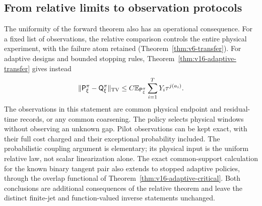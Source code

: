 \subsection{From relative limits to observation protocols}
The uniformity of the forward theorem also has an operational consequence.
For a fixed list of observations, the relative comparison controls the
entire physical experiment, with the failure atom retained
(Theorem~\ref{thm:v6-transfer}). For adaptive designs and bounded
stopping rules, Theorem~\ref{thm:v16-adaptive-transfer} gives instead
\[
 \|\mathsf P_\xi^\pi-\mathsf Q_\xi^\pi\|_{\rm TV}
 \le C\mathbb E_{\mathsf P_\xi^\pi}
                 \sum_{i=1}^{T}Y_i\tau^{j(a_i)}.
\]
The observations in this statement are common physical endpoint and
residual-time records, or any common coarsening. The policy selects physical
windows without observing an unknown gap. Pilot observations can be kept
exact, with their full cost charged and their exceptional probability
included. The probabilistic coupling argument is elementary; its physical
input is the uniform relative law, not scalar linearization alone.
The exact common-support calculation for the known binary tangent pair
also extends to stopped adaptive policies, through the overlap functional
of Theorem~\ref{thm:v16-adaptive-critical}. Both conclusions are additional
consequences of the relative theorem and leave the distinct finite-jet
and function-valued inverse statements unchanged.
